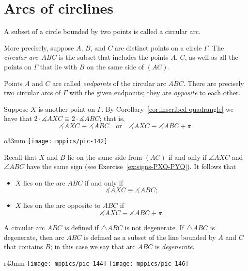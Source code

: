 \section{Arcs of circlines}

A subset of a circle bounded by two points is called a circular arc.

More precisely,
suppose $A$, $B$, and $C$ are distinct points on a circle $\Gamma$.
The \emph{circular arc}~$ABC$ is the subset that includes the points $A$, $C$,
as well as all the points on $\Gamma$ that lie with $B$ on the same side of $(AC)$.

Points $A$ and $C$ are called 
\emph{endpoints} of the circular arc $ABC$. 
There are precisely two circular arcs of $\Gamma$ with the given endpoints; they are \emph{opposite} to each other.

Suppose $X$ is another point on $\Gamma$.
By Corollary~\ref{cor:inscribed-quadrangle} we have
that $2\cdot\measuredangle AXC\equiv 2\cdot\measuredangle ABC$;
that is,
\[\measuredangle AXC\equiv\measuredangle ABC
\quad\text{or}\quad
\measuredangle AXC\equiv\measuredangle ABC+\pi.\]

\begin{wrapfigure}{o}{33mm}
\vskip-2mm
\centering
\texttt{[image: mppics/pic-142]}
\end{wrapfigure}

Recall that $X$ and $B$ lie on the same side from $(AC)$ if and only if $\angle AXC$ and $\angle ABC$ have the same sign (see Exercise~\ref{ex:signs-PXQ-PYQ}).
It follows that 
\begin{itemize}
\item $X$ lies on the arc $ABC$ if and only if 
\[\measuredangle AXC\equiv\measuredangle ABC;\]
\item $X$ lies on the arc opposite to $ABC$ if 
\[\measuredangle AXC\equiv\measuredangle ABC+\pi.\]
\end{itemize}

A circular arc $ABC$ is defined if $\triangle ABC$ is not degenerate.
If $\triangle ABC$ is degenerate, then arc $ABC$ is defined as a subset of the line bounded by $A$ and $C$ that contains $B$;
in this case we say that arc $ABC$ is \emph{degenerate}.


\begin{wrapfigure}{r}{43mm}
\vskip-2mm
\centering
\texttt{[image: mppics/pic-144]}
\vskip4mm
\texttt{[image: mppics/pic-146]}
\end{wrapfigure}

